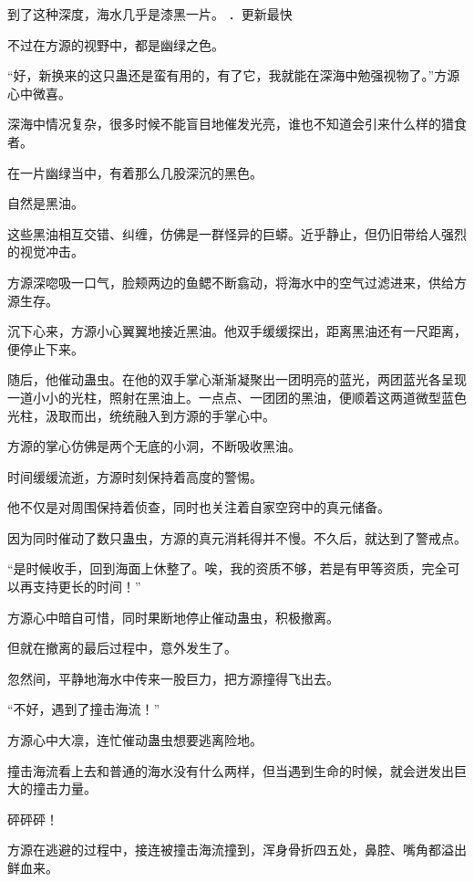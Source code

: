
\begin{this_body}

到了这种深度，海水几乎是漆黑一片。 ．更新最快

不过在方源的视野中，都是幽绿之色。

“好，新换来的这只蛊还是蛮有用的，有了它，我就能在深海中勉强视物了。”方源心中微喜。

深海中情况复杂，很多时候不能盲目地催发光亮，谁也不知道会引来什么样的猎食者。

在一片幽绿当中，有着那么几股深沉的黑色。

自然是黑油。

这些黑油相互交错、纠缠，仿佛是一群怪异的巨蟒。近乎静止，但仍旧带给人强烈的视觉冲击。

方源深唿吸一口气，脸颊两边的鱼鳃不断翕动，将海水中的空气过滤进来，供给方源生存。

沉下心来，方源小心翼翼地接近黑油。他双手缓缓探出，距离黑油还有一尺距离，便停止下来。

随后，他催动蛊虫。在他的双手掌心渐渐凝聚出一团明亮的蓝光，两团蓝光各呈现一道小小的光柱，照射在黑油上。一点点、一团团的黑油，便顺着这两道微型蓝色光柱，汲取而出，统统融入到方源的手掌心中。

方源的掌心仿佛是两个无底的小洞，不断吸收黑油。

时间缓缓流逝，方源时刻保持着高度的警惕。

他不仅是对周围保持着侦查，同时也关注着自家空窍中的真元储备。

因为同时催动了数只蛊虫，方源的真元消耗得并不慢。不久后，就达到了警戒点。

“是时候收手，回到海面上休整了。唉，我的资质不够，若是有甲等资质，完全可以再支持更长的时间！”

方源心中暗自可惜，同时果断地停止催动蛊虫，积极撤离。

但就在撤离的最后过程中，意外发生了。

忽然间，平静地海水中传来一股巨力，把方源撞得飞出去。

“不好，遇到了撞击海流！”

方源心中大凛，连忙催动蛊虫想要逃离险地。

撞击海流看上去和普通的海水没有什么两样，但当遇到生命的时候，就会迸发出巨大的撞击力量。

砰砰砰！

方源在逃避的过程中，接连被撞击海流撞到，浑身骨折四五处，鼻腔、嘴角都溢出鲜血来。


\end{this_body}
